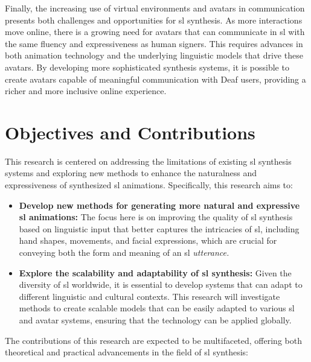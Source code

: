 \documentclass[../../main.tex]{subfiles}
\begin{document}
Finally, the increasing use of virtual environments and avatars in communication presents both challenges and opportunities for \gls{sl} synthesis. As more interactions move online, there is a growing need for avatars that can communicate in \gls{sl} with the same fluency and expressiveness as human signers. This requires advances in both animation technology and the underlying linguistic models that drive these avatars. By developing more sophisticated synthesis systems, it is possible to create avatars capable of meaningful communication with Deaf users, providing a richer and more inclusive online experience.

\section{Objectives and Contributions}
\label{ch:introduction:objectives_contributions}

This research is centered on addressing the limitations of existing \gls{sl} synthesis systems and exploring new methods to enhance the naturalness and expressiveness of synthesized \gls{sl} animations. Specifically, this research aims to:

\begin{itemize}
    \item \textbf{Develop new methods for generating more natural and expressive \gls{sl} animations:} The focus here is on improving the quality of \gls{sl} synthesis based on linguistic input that better captures the intricacies of \gls{sl}, including hand shapes, movements, and facial expressions, which are crucial for conveying both the form and meaning of an \gls{sl} \sl{utterance}.
    \item \textbf{Explore the scalability and adaptability of \gls{sl} synthesis:} Given the diversity of \gls{sl} worldwide, it is essential to develop systems that can adapt to different linguistic and cultural contexts. This research will investigate methods to create scalable models that can be easily adapted to various \gls{sl} and avatar systems, ensuring that the technology can be applied globally.
\end{itemize}

The contributions of this research are expected to be multifaceted, offering both theoretical and practical advancements in the field of \gls{sl} synthesis:
\end{document}
